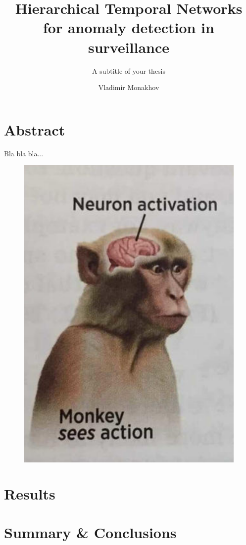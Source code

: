 \documentclass[USenglish]{ifimaster}  %
\title{Hierarchical Temporal Networks for anomaly detection in surveillance}        %
\subtitle{A subtitle of your thesis }         %
\author{Vladimir Monakhov}                      %
\begin{document}
\duoforside[
    dept={Department of Informatics},   %
    program={Informatics: Robotics and Intelligent Systems},         %
    long
]                                        %

\frontmatter{}
\mainmatter{}

\chapter*{Abstract} 
Bla bla bla...
\begin{figure}[H]
    \centering
    \includegraphics[width=0.5\linewidth]{resources/introduction/neuron_activation_monkey.png}
\end{figure}



\tableofcontents

\mainmatter



\chapter{Results}

\chapter{Summary \& Conclusions}
\backmatter{}
\printbibliography
\end{document}

